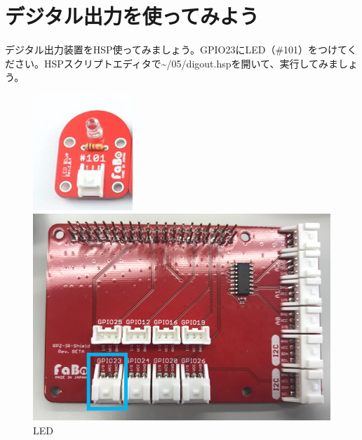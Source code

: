 \newpage
\section{デジタル出力を使ってみよう}
デジタル出力装置をHSP使ってみましょう。GPIO23にLED（\#101）をつけてください。HSPスクリプトエディタで\textasciitilde /05/digout.hspを開いて、実行してみましょう。\\
\begin{figure}[H]
  \begin{minipage}[t]{0.3\columnwidth}
    \centering
 \includegraphics[width=\linewidth]{images/chap05/text05-img026.png}
    \caption{LED}
  \end{minipage}
  \begin{minipage}[t]{0.5\columnwidth}
    \centering
    \includegraphics[width=\linewidth]{images/chap05/text05-img027.png}

\end{minipage}
\end{figure}
